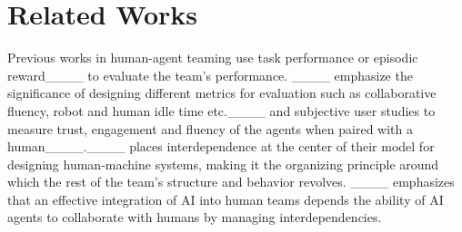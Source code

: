 \section{Related Works}
Previous works in human-agent teaming use task performance or episodic reward____ to evaluate the team's performance. ____ emphasize the significance of designing different metrics for evaluation
such as collaborative fluency, robot and human idle time etc.____ and subjective user studies to measure trust, engagement and fluency of the agents when paired with a human____.____ places interdependence at the center of their model for designing human-machine systems, making it the organizing principle around which the rest of the team's structure and behavior revolves.
____ emphasizes that an effective integration of AI into human teams depends the ability of AI agents to collaborate with humans by managing interdependencies.